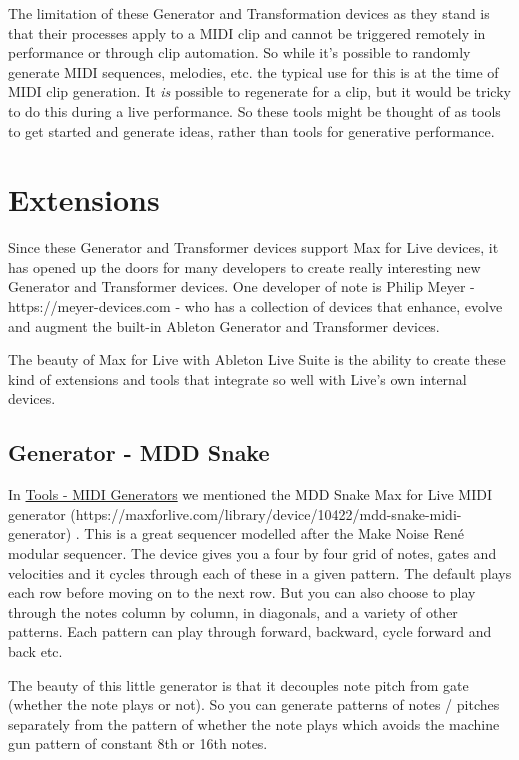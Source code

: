 \documentclass[
  12pt,
  letterpaper,
  oneside,
  open=any]{scrbook}
\begin{document}
The limitation of these Generator and Transformation devices as they
stand is that their processes apply to a MIDI clip and cannot be
triggered remotely in performance or through clip automation. So while
it's possible to randomly generate MIDI sequences, melodies, etc. the
typical use for this is at the time of MIDI clip generation. It
\emph{is} possible to regenerate for a clip, but it would be tricky to
do this during a live performance. So these tools might be thought of as
tools to get started and generate ideas, rather than tools for
generative performance.

\section{Extensions}\label{extensions}

Since these Generator and Transformer devices support Max for Live
devices, it has opened up the doors for many developers to create really
interesting new Generator and Transformer devices. One developer of note
is Philip Meyer - https://meyer-devices.com - who has a collection of
devices that enhance, evolve and augment the built-in Ableton Generator
and Transformer devices.

The beauty of Max for Live with Ableton Live Suite is the ability to
create these kind of extensions and tools that integrate so well with
Live's own internal devices.

\subsection{Generator - MDD Snake}\label{generator---mdd-snake}

In \hyperref[Chapter-012-Tools-MIDI_Generators]{Tools - MIDI Generators}
we mentioned the MDD Snake Max for Live MIDI generator
(https://maxforlive.com/library/device/10422/mdd-snake-midi-generator) .
This is a great sequencer modelled after the Make Noise René modular
sequencer. The device gives you a four by four grid of notes, gates and
velocities and it cycles through each of these in a given pattern. The
default plays each row before moving on to the next row. But you can
also choose to play through the notes column by column, in diagonals,
and a variety of other patterns. Each pattern can play through forward,
backward, cycle forward and back etc.

The beauty of this little generator is that it decouples note pitch from
gate (whether the note plays or not). So you can generate patterns of
notes / pitches separately from the pattern of whether the note plays
which avoids the machine gun pattern of constant 8th or 16th notes.
\end{document}

